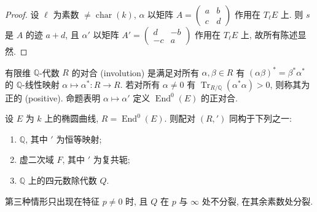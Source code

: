 \begin{proof}
设 $\ell$ 为素数 $\neq\operatorname{char}(k)$, $\alpha$ 以矩阵 $A = \begin{pmatrix}a & b\\ c & d\end{pmatrix}$ 作用在 $T_\ell E$ 上. 则 $s$ 是 $A$ 的迹 $a + d$, 且 $\alpha'$ 以矩阵 $A' = \begin{pmatrix}d & -b\\ -c & a\end{pmatrix}$ 作用在 $T_\ell E$ 上, 故所有陈述显然.
\end{proof}

有限维 $\mathbb{Q}$-代数 $R$ 的对合 (involution) 是满足对所有 $\alpha,\beta\in R$ 有 $(\alpha\beta)^* = \beta^*\alpha^*$ 的 $\mathbb{Q}$-线性映射 $\alpha\mapsto\alpha^*\colon R\to R$. 若对所有 $\alpha\neq 0$ 有 $\operatorname{Tr}_{R/\mathbb{Q}}(\alpha^*\alpha) > 0$, 则称其为正的 (positive). 命题表明 $\alpha\mapsto\alpha'$ 定义 $\operatorname{End}^0(E)$ 的正对合.

\begin{theorem} \label{thm:2.6.9} 
设 $E$ 为 $k$ 上的椭圆曲线, $R = \operatorname{End}^0(E)$. 则配对 $(R, {}')$ 同构于下列之一:
\begin{enumerate}[label=\textup{(\alph*)}]
\item $\mathbb{Q}$, 其中 $'$ 为恒等映射;
\item 虚二次域 $F$, 其中 $'$ 为复共轭;
\item $\mathbb{Q}$ 上的四元数除代数 $Q$.
\end{enumerate}
第三种情形只出现在特征 $p\neq 0$ 时, 且 $Q$ 在 $p$ 与 $\infty$ 处不分裂, 在其余素数处分裂.
\end{theorem}

